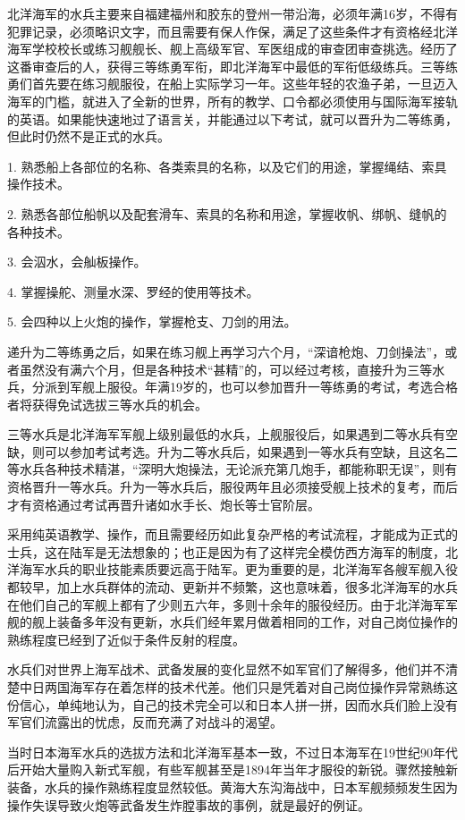 \documentclass[12pt,UTF8]{ctexbook}
\begin{document}
北洋海军的水兵主要来自福建福州和胶东的登州一带沿海，必须年满16岁，不得有犯罪记录，必须略识文字，而且需要有保人作保，满足了这些条件才有资格经北洋海军学校校长或练习舰舰长、舰上高级军官、军医组成的审查团审查挑选。经历了这番审查后的人，获得三等练勇军衔，即北洋海军中最低的军衔低级练兵。三等练勇们首先要在练习舰服役，在船上实际学习一年。这些年轻的农渔子弟，一旦迈入海军的门槛，就进入了全新的世界，所有的教学、口令都必须使用与国际海军接轨的英语。如果能快速地过了语言关，并能通过以下考试，就可以晋升为二等练勇，但此时仍然不是正式的水兵。

1. 熟悉船上各部位的名称、各类索具的名称，以及它们的用途，掌握绳结、索具操作技术。

2. 熟悉各部位船帆以及配套滑车、索具的名称和用途，掌握收帆、绑帆、缝帆的各种技术。

3. 会泅水，会舢板操作。

4. 掌握操舵、测量水深、罗经的使用等技术。

5. 会四种以上火炮的操作，掌握枪支、刀剑的用法。

递升为二等练勇之后，如果在练习舰上再学习六个月，“深谙枪炮、刀剑操法”，或者虽然没有满六个月，但是各种技术“甚精”的，可以经过考核，直接升为三等水兵，分派到军舰上服役。年满19岁的，也可以参加晋升一等练勇的考试，考选合格者将获得免试选拔三等水兵的机会。

三等水兵是北洋海军军舰上级别最低的水兵，上舰服役后，如果遇到二等水兵有空缺，则可以参加考试考选。升为二等水兵后，如果遇到一等水兵有空缺，且这名二等水兵各种技术精湛，“深明大炮操法，无论派充第几炮手，都能称职无误”，则有资格晋升一等水兵。升为一等水兵后，服役两年且必须接受舰上技术的复考，而后才有资格通过考试再晋升诸如水手长、炮长等士官阶层。

采用纯英语教学、操作，而且需要经历如此复杂严格的考试流程，才能成为正式的士兵，这在陆军是无法想象的；也正是因为有了这样完全模仿西方海军的制度，北洋海军水兵的职业技能素质要远高于陆军。更为重要的是，北洋海军各艘军舰入役都较早，加上水兵群体的流动、更新并不频繁，这也意味着，很多北洋海军的水兵在他们自己的军舰上都有了少则五六年，多则十余年的服役经历。由于北洋海军军舰的舰上装备多年没有更新，水兵们经年累月做着相同的工作，对自己岗位操作的熟练程度已经到了近似于条件反射的程度。

水兵们对世界上海军战术、武备发展的变化显然不如军官们了解得多，他们并不清楚中日两国海军存在着怎样的技术代差。他们只是凭着对自己岗位操作异常熟练这份信心，单纯地认为，自己的技术完全可以和日本人拼一拼，因而水兵们脸上没有军官们流露出的忧虑，反而充满了对战斗的渴望。

当时日本海军水兵的选拔方法和北洋海军基本一致，不过日本海军在19世纪90年代后开始大量购入新式军舰，有些军舰甚至是1894年当年才服役的新锐。骤然接触新装备，水兵的操作熟练程度显然较低。黄海大东沟海战中，日本军舰频频发生因为操作失误导致火炮等武备发生炸膛事故的事例，就是最好的例证。
\end{document}
